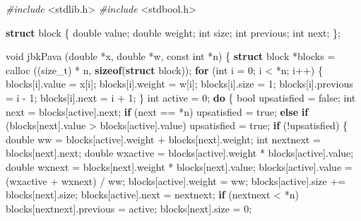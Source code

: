 \documentclass[12pt,]{article}
\newenvironment{Shaded}{\begin{snugshade}}{\end{snugshade}}
\newcommand{\KeywordTok}[1]{\textcolor[rgb]{0.13,0.29,0.53}{\textbf{#1}}}
\newcommand{\DataTypeTok}[1]{\textcolor[rgb]{0.13,0.29,0.53}{#1}}
\newcommand{\DecValTok}[1]{\textcolor[rgb]{0.00,0.00,0.81}{#1}}
\newcommand{\ImportTok}[1]{#1}
\newcommand{\ControlFlowTok}[1]{\textcolor[rgb]{0.13,0.29,0.53}{\textbf{#1}}}
\newcommand{\PreprocessorTok}[1]{\textcolor[rgb]{0.56,0.35,0.01}{\textit{#1}}}
\newcommand{\NormalTok}[1]{#1}
\begin{document}
\begin{Shaded}
\begin{Highlighting}[]
\PreprocessorTok{#include }\ImportTok{<stdlib.h>}
\PreprocessorTok{#include }\ImportTok{<stdbool.h>}

\KeywordTok{struct}\NormalTok{ block \{}
    \DataTypeTok{double}\NormalTok{ value;}
    \DataTypeTok{double}\NormalTok{ weight;}
    \DataTypeTok{int}\NormalTok{ size;}
    \DataTypeTok{int}\NormalTok{ previous;}
    \DataTypeTok{int}\NormalTok{ next;}
\NormalTok{\};}

\DataTypeTok{void}\NormalTok{ jbkPava (}\DataTypeTok{double}\NormalTok{ *x, }\DataTypeTok{double}\NormalTok{ *w, }\DataTypeTok{const} \DataTypeTok{int}\NormalTok{ *n) \{}
    \KeywordTok{struct}\NormalTok{ block *blocks = calloc ((}\DataTypeTok{size_t}\NormalTok{) * n, }\KeywordTok{sizeof}\NormalTok{(}\KeywordTok{struct}\NormalTok{ block));}
    \ControlFlowTok{for}\NormalTok{ (}\DataTypeTok{int}\NormalTok{ i = }\DecValTok{0}\NormalTok{; i < *n; i++) \{}
\NormalTok{        blocks[i].value = x[i];}
\NormalTok{        blocks[i].weight = w[i];}
\NormalTok{        blocks[i].size = }\DecValTok{1}\NormalTok{;}
\NormalTok{        blocks[i].previous = i - }\DecValTok{1}\NormalTok{; }
\NormalTok{        blocks[i].next = i + }\DecValTok{1}\NormalTok{;   }
\NormalTok{    \}}
    \DataTypeTok{int}\NormalTok{ active = }\DecValTok{0}\NormalTok{;}
    \ControlFlowTok{do}\NormalTok{ \{}
\NormalTok{        bool upsatisfied = false;}
        \DataTypeTok{int}\NormalTok{ next = blocks[active].next; }
        \ControlFlowTok{if}\NormalTok{ (next == *n) upsatisfied = true;}
        \ControlFlowTok{else} \ControlFlowTok{if}\NormalTok{ (blocks[next].value > blocks[active].value) }
\NormalTok{            upsatisfied = true;}
        \ControlFlowTok{if}\NormalTok{ (!upsatisfied) \{}
            \DataTypeTok{double}\NormalTok{ ww = blocks[active].weight + blocks[next].weight;}
            \DataTypeTok{int}\NormalTok{ nextnext = blocks[next].next;}
            \DataTypeTok{double}\NormalTok{ wxactive = blocks[active].weight * blocks[active].value;}
            \DataTypeTok{double}\NormalTok{ wxnext = blocks[next].weight * blocks[next].value;}
\NormalTok{            blocks[active].value = (wxactive + wxnext) / ww;}
\NormalTok{            blocks[active].weight = ww;}
\NormalTok{            blocks[active].size += blocks[next].size;}
\NormalTok{            blocks[active].next = nextnext;}
            \ControlFlowTok{if}\NormalTok{ (nextnext < *n)}
\NormalTok{                blocks[nextnext].previous = active;}
\NormalTok{            blocks[next].size = }\DecValTok{0}\NormalTok{;}

\end{Highlighting}
\end{Shaded}
\end{document}
